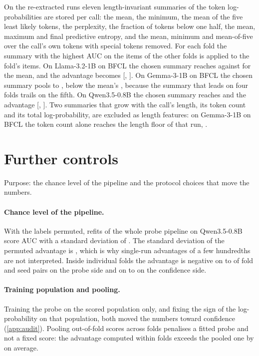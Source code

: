 On the re-extracted runs eleven length-invariant summaries of the token log-probabilities are stored per call: the mean, the minimum, the mean of the five least likely tokens, the perplexity, the fraction of tokens below one half, the mean, maximum and final predictive entropy, and the mean, minimum and mean-of-five over the call's own tokens with special tokens removed. For each fold the summary with the highest AUC on the items of the other folds is applied to the fold's items. On Llama-3.2-1B on BFCL the chosen summary reaches \aucBestConfLlamaOneBBfcl{} against \aucConfLlamaOneBBfcl{} for the mean, and the advantage becomes \gapBestLlamaOneBBfcl{} [\gapBestLoLlamaOneBBfcl{}, \gapBestHiLlamaOneBBfcl{}]. On Gemma-3-1B on BFCL the chosen summary pools to \aucBestConfGemmaBfcl{}, below the mean's \aucConfGemmaBfcl{}, because the summary that leads on four folds trails on the fifth. On Qwen3.5-0.8B the chosen summary reaches \aucBestConfQwenThreeFiveBfcl{} and the advantage \gapBestQwenThreeFiveBfcl{} [\gapBestLoQwenThreeFiveBfcl{}, \gapBestHiQwenThreeFiveBfcl{}]. Two summaries that grow with the call's length, its token count and its total log-probability, are excluded as length features: on Gemma-3-1B on BFCL the token count alone reaches the length floor of that run, \aucFloorGemmaBfcl{}.

\section{Further controls}
\label{app:more}

Purpose: the chance level of the pipeline and the protocol choices that move the numbers.

\paragraph{Chance level of the pipeline.}
With the labels permuted, \nullN{} refits of the whole probe pipeline on Qwen3.5-0.8B score \nullMean{} AUC with a standard deviation of \nullSd{}. The standard deviation of the permuted advantage is \nullGapSd{}, which is why single-run advantages of a few hundredths are not interpreted. Inside individual folds the advantage is negative on \foldNegMinInternals{} to \foldNegMaxInternals{} of \nFoldGaps{} fold and seed pairs on the probe side and on \foldNegMinConfidence{} to \foldNegMaxConfidence{} on the confidence side.

\paragraph{Training population and pooling.}
Training the probe on the scored population only, and fixing the sign of the log-probability on that population, both moved the numbers toward confidence (\cref{app:audit}). Pooling out-of-fold scores across folds penalises a fitted probe and not a fixed score: the advantage computed within folds exceeds the pooled one by \poolShiftMean{} on average.

